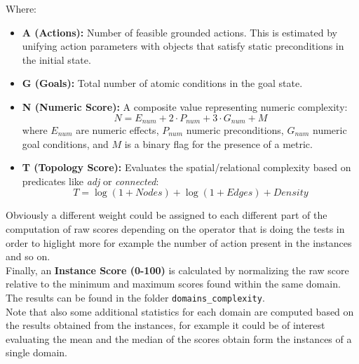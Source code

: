 \documentclass[a4paper]{article}
\begin{document}
    Where:
    \begin{itemize}
        \item \textbf{A (Actions):} Number of feasible grounded actions. This is estimated by unifying action parameters with objects that satisfy static preconditions in the initial state.
        \item \textbf{G (Goals):} Total number of atomic conditions in the goal state.
        \item \textbf{N (Numeric Score):} A composite value representing numeric complexity:
        \begin{equation}
            N = E_{num} + 2 \cdot P_{num} + 3 \cdot G_{num} + M
        \end{equation}
        where $E_{num}$ are numeric effects, $P_{num}$ numeric preconditions, $G_{num}$ numeric goal conditions, and $M$ is a binary flag for the presence of a metric.
        \item \textbf{T (Topology Score):} Evaluates the spatial/relational complexity based on predicates like \textit{adj} or \textit{connected}:
        \begin{equation}
            T = \log(1 + Nodes) + \log(1 + Edges) + Density
        \end{equation}
    \end{itemize}
    Obviously a different weight could be assigned to each different part of the computation of raw scores depending on the operator that is doing the tests in order to higlight more for example the number of action present in the instances and so on.\\
    Finally, an \textbf{Instance Score (0-100)} is calculated by normalizing the raw score relative to the minimum and maximum scores found within the same domain. The results can be found in the folder \texttt{domains\_complexity}.\\
    Note that also some additional statistics for each domain are computed based on the results obtained from the instances, for example it could be of interest evaluating the mean and the median of the scores obtain form the instances of a single domain.
\end{document}

